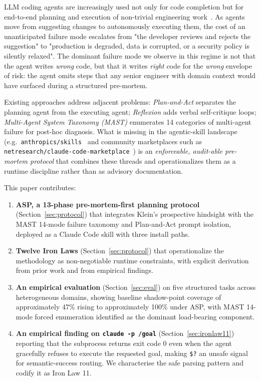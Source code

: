 \documentclass[11pt, a4paper]{article}
\begin{document}
LLM coding agents are increasingly used not only for code completion but for end-to-end planning and execution of non-trivial engineering work~\citep{wang2024llmagents, anthropic2026claudecode}. As agents move from suggesting changes to autonomously executing them, the cost of an unanticipated failure mode escalates from "the developer reviews and rejects the suggestion" to "production is degraded, data is corrupted, or a security policy is silently relaxed". The dominant failure mode we observe in this regime is not that the agent writes \emph{wrong} code, but that it writes \emph{right} code for the \emph{wrong} envelope of risk: the agent omits steps that any senior engineer with domain context would have surfaced during a structured pre-mortem.

Existing approaches address adjacent problems: \emph{Plan-and-Act} \citep{erdogan2025planandact} separates the planning agent from the executing agent; \emph{Reflexion} \citep{shinn2023reflexion} adds verbal self-critique loops; \emph{Multi-Agent System Taxonomy (MAST)} \citep{cemri2025mast} enumerates 14 categories of multi-agent failure for post-hoc diagnosis. What is missing in the agentic-skill landscape (e.g.\ \texttt{anthropics/skills}~\citep{anthropic2026skillsrepo} and community marketplaces such as \texttt{netresearch/claude-code-marketplace}~\citep{netresearch2026marketplace}) is an \emph{enforceable, audit-able pre-mortem protocol} that combines these threads and operationalizes them as a runtime discipline rather than as advisory documentation.

This paper contributes:

\begin{enumerate}[leftmargin=*, itemsep=2pt]
  \item \textbf{ASP, a 13-phase pre-mortem-first planning protocol} (Section~\ref{sec:protocol}) that integrates Klein's prospective hindsight with the MAST 14-mode failure taxonomy and Plan-and-Act prompt isolation, deployed as a Claude Code skill with three install paths.
  \item \textbf{Twelve Iron Laws} (Section~\ref{sec:protocol}) that operationalize the methodology as non-negotiable runtime constraints, with explicit derivation from prior work and from empirical findings.
  \item \textbf{An empirical evaluation} (Section~\ref{sec:eval}) on five structured tasks across heterogeneous domains, showing baseline shadow-point coverage of approximately 47\% rising to approximately 100\% under ASP, with MAST 14-mode forced enumeration identified as the dominant load-bearing component.
  \item \textbf{An empirical finding on \texttt{claude -p /goal}} (Section~\ref{sec:ironlaw11}) reporting that the subprocess returns exit code 0 even when the agent gracefully refuses to execute the requested goal, making \texttt{\$?} an unsafe signal for semantic-success routing. We characterise the safe parsing pattern and codify it as Iron Law 11.
\end{enumerate}
\end{document}
